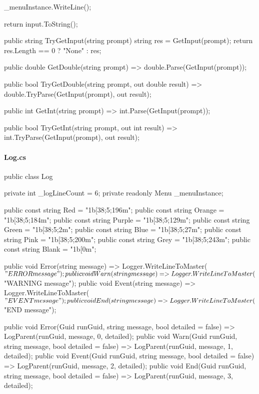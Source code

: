 \begin{flushleft}
\begin{cscode}
{{        _menuInstance.WriteLine();

        return input.ToString();
    }

    public string TryGetInput(string prompt)
    {
        string res = GetInput(prompt);
        return res.Length == 0 ? "None" : res;
    }

    public double GetDouble(string prompt) => double.Parse(GetInput(prompt));

    public bool TryGetDouble(string prompt, out double result) => double.TryParse(GetInput(prompt), out result);

    public int GetInt(string prompt) => int.Parse(GetInput(prompt));

    public bool TryGetInt(string prompt, out int result) => int.TryParse(GetInput(prompt), out result);
}
    \end{cscode}
\pagebreak
    
    \paragraph{Log.cs}
    \begin{cscode}
public class Log
{
    private int _logLineCount = 6;
    private readonly Menu _menuInstance;

    public const string Red = "\x1b[38;5;196m";
    public const string Orange = "\x1b[38;5;184m";
    public const string Purple = "\x1b[38;5;129m";
    public const string Green = "\x1b[38;5;2m";
    public const string Blue = "\x1b[38;5;27m";
    public const string Pink = "\x1b[38;5;200m";
    public const string Grey = "\x1b[38;5;243m";
    public const string Blank = "\x1b[0m";

    public void Error(string message) => Logger.WriteLineToMaster($"ERROR {message}");
    public void Warn(string message) => Logger.WriteLineToMaster($"WARNING {message}");
    public void Event(string message) => Logger.WriteLineToMaster($"EVENT {message}");
    public void End(string message) => Logger.WriteLineToMaster($"END {message}");

    public void Error(Guid runGuid, string message, bool detailed = false) => LogParent(runGuid, message, 0, detailed);
    public void Warn(Guid runGuid, string message, bool detailed = false) => LogParent(runGuid, message, 1, detailed);
    public void Event(Guid runGuid, string message, bool detailed = false) => LogParent(runGuid, message, 2, detailed);
    public void End(Guid runGuid, string message, bool detailed = false) => LogParent(runGuid, message, 3, detailed);

}
\end{cscode}
\end{flushleft}
